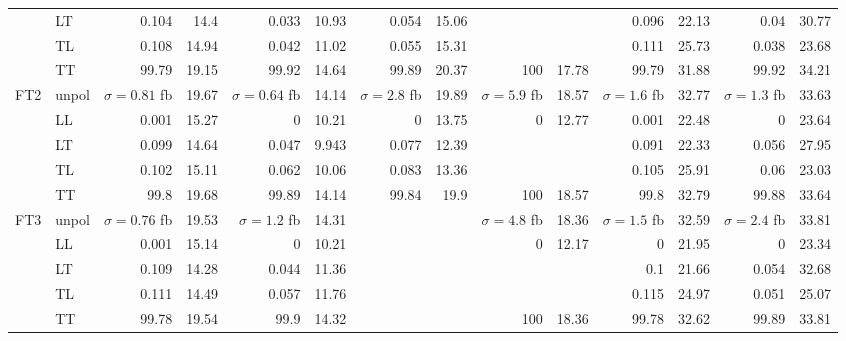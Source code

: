 \begin{table}[H]
{\begin{tabular}{llrrrrrrrrrrrr}
 & LT & \num{0.104} & \num{14.4} & \num{0.033} & \num{10.93} & \num{0.054} & \num{15.06} &  &  & \num{0.096} & \num{22.13} & \num{0.04} & \num{30.77} \\
 & TL & \num{0.108} & \num{14.94} & \num{0.042} & \num{11.02} & \num{0.055} & \num{15.31} &  &  & \num{0.111} & \num{25.73} & \num{0.038} & \num{23.68} \\
 & TT & \num{99.79} & \num{19.15} & \num{99.92} & \num{14.64} & \num{99.89} & \num{20.37} & \num{100} & \num{17.78} & \num{99.79} & \num{31.88} & \num{99.92} & \num{34.21} \\
\midrule
\multirow{5}{*}{FT2}
 & unpol & $\sigma = \num{0.81}$ fb & \num{19.67} & $\sigma = \num{0.64}$ fb & \num{14.14} & $\sigma = \num{2.8}$ fb & \num{19.89} & $\sigma = \num{5.9}$ fb & \num{18.57} & $\sigma = \num{1.6}$ fb & \num{32.77} & $\sigma = \num{1.3}$ fb & \num{33.63} \\
 & LL & \num{0.001} & \num{15.27} & \num{0} & \num{10.21} & \num{0} & \num{13.75} & \num{0} & \num{12.77} & \num{0.001} & \num{22.48} & \num{0} & \num{23.64} \\
 & LT & \num{0.099} & \num{14.64} & \num{0.047} & \num{9.943} & \num{0.077} & \num{12.39} &  &  & \num{0.091} & \num{22.33} & \num{0.056} & \num{27.95} \\
 & TL & \num{0.102} & \num{15.11} & \num{0.062} & \num{10.06} & \num{0.083} & \num{13.36} &  &  & \num{0.105} & \num{25.91} & \num{0.06} & \num{23.03} \\
 & TT & \num{99.8} & \num{19.68} & \num{99.89} & \num{14.14} & \num{99.84} & \num{19.9} & \num{100} & \num{18.57} & \num{99.8} & \num{32.79} & \num{99.88} & \num{33.64} \\
\midrule
\multirow{5}{*}{FT3}
 & unpol & $\sigma = \num{0.76}$ fb & \num{19.53} & $\sigma = \num{1.2}$ fb & \num{14.31} &  &  & $\sigma = \num{4.8}$ fb & \num{18.36} & $\sigma = \num{1.5}$ fb & \num{32.59} & $\sigma = \num{2.4}$ fb & \num{33.81} \\
 & LL & \num{0.001} & \num{15.14} & \num{0} & \num{10.21} &  &  & \num{0} & \num{12.17} & \num{0} & \num{21.95} & \num{0} & \num{23.34} \\
 & LT & \num{0.109} & \num{14.28} & \num{0.044} & \num{11.36} &  &  &  &  & \num{0.1} & \num{21.66} & \num{0.054} & \num{32.68} \\
 & TL & \num{0.111} & \num{14.49} & \num{0.057} & \num{11.76} &  &  &  &  & \num{0.115} & \num{24.97} & \num{0.051} & \num{25.07} \\
 & TT & \num{99.78} & \num{19.54} & \num{99.9} & \num{14.32} &  &  & \num{100} & \num{18.36} & \num{99.78} & \num{32.62} & \num{99.89} & \num{33.81} \\

\end{tabular}}
\end{table}
